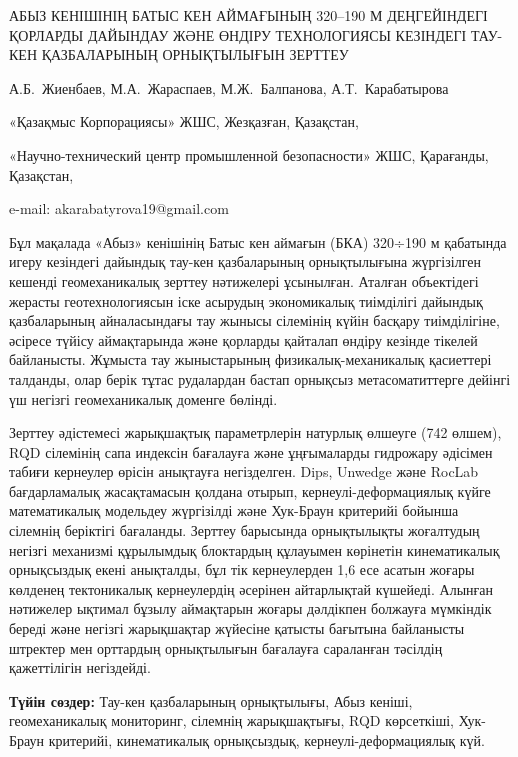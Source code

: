 \begin{header}
АБЫЗ КЕНІШІНІҢ БАТЫС КЕН АЙМАҒЫНЫҢ 320--190 М ДЕҢГЕЙІНДЕГІ ҚОРЛАРДЫ ДАЙЫНДАУ ЖӘНЕ ӨНДІРУ ТЕХНОЛОГИЯСЫ КЕЗІНДЕГІ ТАУ-КЕН ҚАЗБАЛАРЫНЫҢ ОРНЫҚТЫЛЫҒЫН ЗЕРТТЕУ

А.Б.~Жиенбаев,
М.А.~Жараспаев,
М.Ж.~Балпанова,
А.Т.~Карабатырова\envelope
\end{header}

\begin{affil}
«Қазақмыс Корпорациясы» ЖШС, Жезқазған, Қазақстан,

«Научно-технический центр промышленной безопасности» ЖШС, Қарағанды, Қазақстан,

e-mail: akarabatyrova19@gmail.com
\end{affil}

Бұл мақалада «Абыз» кенішінің Батыс кен аймағын (БКА) 320÷190 м
қабатында игеру кезіндегі дайындық тау-кен қазбаларының орнықтылығына
жүргізілген кешенді геомеханикалық зерттеу нәтижелері ұсынылған. Аталған
объектідегі жерасты геотехнологиясын іске асырудың экономикалық
тиімділігі дайындық қазбаларының айналасындағы тау жынысы сілемінің
күйін басқару тиімділігіне, әсіресе түйісу аймақтарында және қорларды
қайталап өндіру кезінде тікелей байланысты. Жұмыста тау жыныстарының
физикалық-механикалық қасиеттері талданды, олар берік тұтас рудалардан
бастап орнықсыз метасоматиттерге дейінгі үш негізгі геомеханикалық
доменге бөлінді.

Зерттеу әдістемесі жарықшақтық параметрлерін натурлық өлшеуге (742
өлшем), RQD сілемінің сапа индексін бағалауға және ұңғымаларды гидрожару
әдісімен табиғи кернеулер өрісін анықтауға негізделген. Dips, Unwedge
және RocLab бағдарламалық жасақтамасын қолдана отырып,
кернеулі-деформациялық күйге математикалық модельдеу жүргізілді және
Хук-Браун критерийі бойынша сілемнің беріктігі бағаланды. Зерттеу
барысында орнықтылықты жоғалтудың негізгі механизмі құрылымдық
блоктардың құлауымен көрінетін кинематикалық орнықсыздық екені
анықталды, бұл тік кернеулерден 1,6 есе асатын жоғары көлденең
тектоникалық кернеулердің әсерінен айтарлықтай күшейеді. Алынған
нәтижелер ықтимал бұзылу аймақтарын жоғары дәлдікпен болжауға мүмкіндік
береді және негізгі жарықшақтар жүйесіне қатысты бағытына байланысты
штректер мен орттардың орнықтылығын бағалауға сараланған тәсілдің
қажеттілігін негіздейді.

{\bfseries Түйін сөздер:} Тау-кен қазбаларының орнықтылығы, Абыз кеніші,
геомеханикалық мониторинг, сілемнің жарықшақтығы, RQD көрсеткіші,
Хук-Браун критерийі, кинематикалық орнықсыздық, кернеулі-деформациялық
күй.

